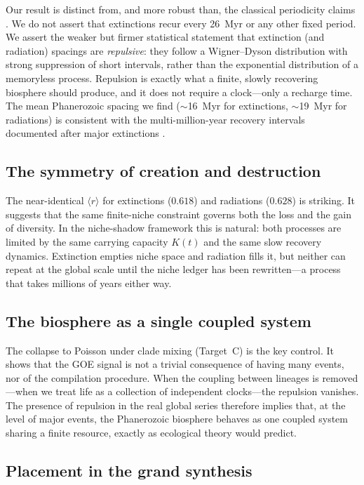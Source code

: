 \documentclass[12pt,a4paper]{article}
\begin{document}
Our result is distinct from, and more robust than, the classical periodicity claims \citep{raup1984,melott2010}. We do not assert that extinctions recur every 26~Myr or any other fixed period. We assert the weaker but firmer statistical statement that extinction (and radiation) spacings are \emph{repulsive}: they follow a Wigner--Dyson distribution with strong suppression of short intervals, rather than the exponential distribution of a memoryless process. Repulsion is exactly what a finite, slowly recovering biosphere should produce, and it does not require a clock---only a recharge time. The mean Phanerozoic spacing we find ($\sim$16~Myr for extinctions, $\sim$19~Myr for radiations) is consistent with the multi-million-year recovery intervals documented after major extinctions \citep{erwin1998,sahney2008}.

\subsection{The symmetry of creation and destruction}

The near-identical $\langle r\rangle$ for extinctions ($0.618$) and radiations ($0.628$) is striking. It suggests that the same finite-niche constraint governs both the loss and the gain of diversity. In the niche-shadow framework this is natural: both processes are limited by the same carrying capacity $K(t)$ and the same slow recovery dynamics. Extinction empties niche space and radiation fills it, but neither can repeat at the global scale until the niche ledger has been rewritten---a process that takes millions of years either way.

\subsection{The biosphere as a single coupled system}

The collapse to Poisson under clade mixing (Target~C) is the key control. It shows that the GOE signal is not a trivial consequence of having many events, nor of the compilation procedure. When the coupling between lineages is removed---when we treat life as a collection of independent clocks---the repulsion vanishes. The presence of repulsion in the real global series therefore implies that, at the level of major events, the Phanerozoic biosphere behaves as one coupled system sharing a finite resource, exactly as ecological theory would predict.

\subsection{Placement in the grand synthesis}
\end{document}
